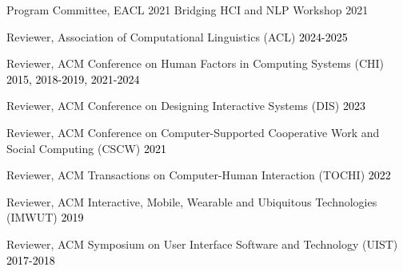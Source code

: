 Program Committee, EACL 2021 Bridging HCI and NLP Workshop \hfill 2021

Reviewer, Association of Computational Linguistics (ACL) \hfill \textcolor{black}{2024-2025}

Reviewer, ACM Conference on Human Factors in Computing Systems (CHI) \hfill \textcolor{black}{2015, 2018-2019, 2021-2024}

Reviewer, ACM Conference on Designing Interactive Systems (DIS) \hfill \textcolor{black}{2023}

Reviewer, ACM Conference on Computer-Supported Cooperative Work and Social Computing (CSCW) \hfill \textcolor{black}{2021}

Reviewer, ACM Transactions on Computer-Human Interaction (TOCHI) \hfill \textcolor{black}{2022}

Reviewer, ACM Interactive, Mobile, Wearable and Ubiquitous Technologies (IMWUT) \hfill \textcolor{black}{2019}

Reviewer, ACM Symposium on User Interface Software and Technology (UIST) \hfill \textcolor{black}{2017-2018}\\




% 



% 


%
% 






%
%
%
%
%
%

